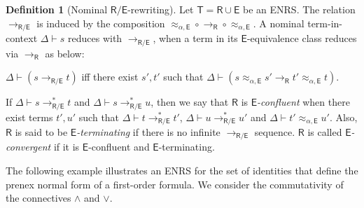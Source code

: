 \documentclass[submission,copyright,creativecommons]{eptcs}
\newcommand{\daniele}[1]{\textcolor{cyan}{#1}}
\newcommand{\ealeq}{\approx_{\alpha,\theory{E}}}
\newcommand{\alert}[1]{\textcolor{red}{#1}}
\newcommand{\theory}[1]{\ensuremath{\mathsf{#1}}}
\theoremstyle{plain}
\theoremstyle{definition}
\newtheorem{definition}[theorem]{Definition}
\theoremstyle{remark}
\begin{document}
\begin{definition}[Nominal \theory{R/E}-rewriting]\label{def:RE-rewriting}
Let $\theory{T}=\theory{R}{\cup}\theory{E}$ be an ENRS. The relation $\to_\theory{R/E}$ is induced by the composition $\ealeq \circ \to_\theory{R}\circ \ealeq$. A nominal term-in-context $\Delta \vdash s$ reduces with   $\to_{\theory{R/E}}$, when a term in its $\theory{E}$-equivalence class reduces via $\to_{\theory{R}}$ as below:
\begin{center}
$\Delta \vdash (s \to_{\theory{R/E}} t)$ iff there exist $s',t'$ such that $\Delta \vdash (s \ealeq s' \to_\theory{R} t' \ealeq t)$.
\end{center}

If $\Delta \vdash s \to_\theory{R/E}^* t$ and $\Delta \vdash s \to_\theory{R/E}^* u$, then we say  that $\theory{R}$ is \emph{$\theory{E}$-confluent} when there exist terms $t',u'$ such that $\Delta \vdash t \to_\theory{R/E}^* t'$, $\Delta \vdash u \to_\theory{R/E}^* u'$ and $\Delta\vdash t'\ealeq u'$.
Also, $\theory{R}$ is said to be \emph{$\theory{E}$-terminating} if there is no infinite $\to_\theory{R/E}$ sequence.
 $\theory{R}$ is called \emph{$\theory{E}$-convergent} if it is $\theory{E}$-confluent and $\theory{E}$-terminating.
\end{definition}
The following example illustrates an ENRS for the set of identities that define the prenex normal form of a first-order formula. We consider the commutativity of the connectives $\wedge$ and $\vee$.
\end{document}
